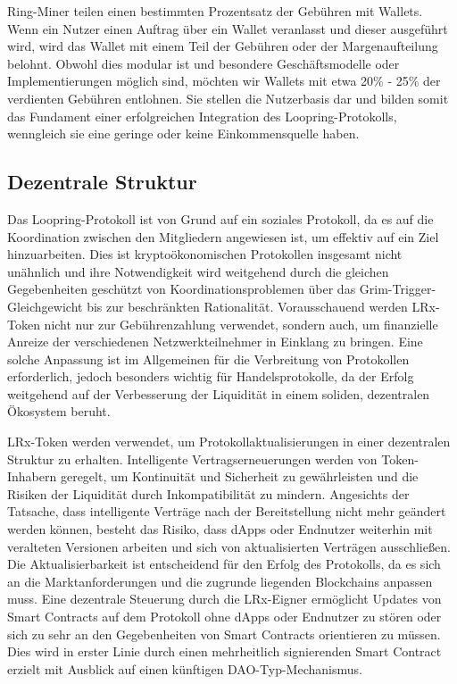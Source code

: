 \documentclass[UTF8,nofonts]{article}
\begin{document}
\begin{multicols}{2}
Ring-Miner teilen einen bestimmten Prozentsatz der Gebühren mit Wallets. Wenn ein Nutzer einen Auftrag über ein Wallet veranlasst und dieser ausgeführt wird, wird das Wallet mit einem Teil der Gebühren oder der Margenaufteilung belohnt. Obwohl dies modular ist und besondere Geschäftsmodelle oder Implementierungen möglich sind, möchten wir Wallets mit etwa 20\% - 25\% der verdienten Gebühren entlohnen. Sie stellen die Nutzerbasis dar und bilden somit das Fundament einer erfolgreichen Integration des Loopring-Protokolls, wenngleich sie eine geringe oder keine Einkommensquelle haben.

\subsection{Dezentrale Struktur}
Das Loopring-Protokoll ist von Grund auf ein soziales Protokoll, da es auf die Koordination zwischen den Mitgliedern angewiesen ist, um effektiv auf ein Ziel hinzuarbeiten. Dies ist kryptoökonomischen Protokollen insgesamt nicht unähnlich und ihre Notwendigkeit wird weitgehend durch die gleichen Gegebenheiten geschützt von Koordinationsproblemen \cite{vitalikgovernance} über das Grim-Trigger-Gleichgewicht bis zur beschränkten Rationalität. Vorausschauend werden LRx-Token nicht nur zur Gebührenzahlung verwendet, sondern auch, um finanzielle Anreize der verschiedenen Netzwerkteilnehmer in Einklang zu bringen. Eine solche Anpassung ist im Allgemeinen für die Verbreitung von Protokollen erforderlich, jedoch besonders wichtig für Handelsprotokolle, da der Erfolg weitgehend auf der Verbesserung der Liquidität in einem soliden, dezentralen Ökosystem beruht.

LRx-Token werden verwendet, um Protokollaktualisierungen in einer dezentralen Struktur zu erhalten. Intelligente Vertragserneuerungen werden von Token-Inhabern geregelt, um Kontinuität und Sicherheit zu gewährleisten und die Risiken der Liquidität durch Inkompatibilität zu mindern. Angesichts der Tatsache, dass intelligente Verträge nach der Bereitstellung nicht mehr geändert werden können, besteht das Risiko, dass dApps oder Endnutzer weiterhin mit veralteten Versionen arbeiten und sich von aktualisierten Verträgen ausschließen. Die Aktualisierbarkeit ist entscheidend für den Erfolg des Protokolls, da es sich an die Marktanforderungen und die zugrunde liegenden Blockchains anpassen muss. Eine dezentrale Steuerung durch die LRx-Eigner ermöglicht Updates von Smart Contracts auf dem Protokoll ohne dApps oder Endnutzer zu stören oder sich zu sehr an den Gegebenheiten von Smart Contracts orientieren zu müssen. Dies wird in erster Linie durch einen mehrheitlich signierenden Smart Contract erzielt mit Ausblick auf einen künftigen DAO-Typ-Mechanismus.


\end{multicols}
\end{document}
